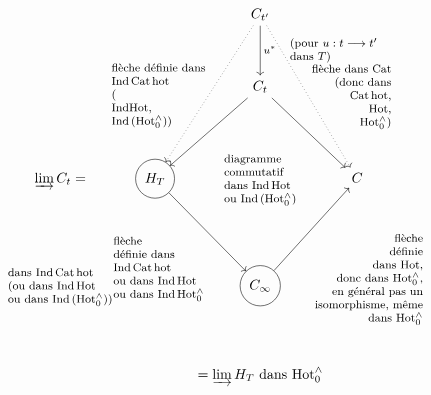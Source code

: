 \[
\begin{tikzcd}[column sep=small, row sep=huge]
 & & C_{t'} \arrow[d, "{u^{*}\quad\lab{(pour $u : t \longrightarrow t'$\\ dans $T$)}}"] \arrow[ldd, dotted] \arrow[rdd, dotted] & \\
 & & C_{t} \arrow[ld, swap, "{\lab{flèche définie dans\\ Ind\,Cat\,hot\\ (\\ IndHot,\\ Ind\,($\Hotz$))}}"] \arrow[rd, "{\lab[r]{flèche dans Cat\\ (donc dans\\ Cat\,hot,\\ Hot,\\ $\Hotz$)}}"] & \\
\varinjlim C_{t} = & |[draw, circle]| H_{T} \arrow[rd, swap, "{\lab{flèche\\ définie dans\\ Ind\,Cat\,hot\\ ou dans Ind\,Hot\\ ou dans Ind\,$\Hotz$}}"] & \lab{diagramme\\ commutatif\\ dans Ind\,Hot\\ ou Ind\,($\Hotz$)} & C \\
\lab{dans Ind\,Cat\,hot\\ (ou dans Ind\,Hot\\ ou dans Ind\,($\Hotz$))} & & |[draw, circle]| C_{\infty} \arrow[ru, swap, "{\lab[r]{flèche\\ définie\\ dans Hot,\\ donc dans $\Hotz$,\\ en général pas un\\ isomorphisme, même\\ dans $\Hotz$}}"] & \\
 & & = \varinjlim H_{T} \text{ dans } \Hotz &
\end{tikzcd}
\]

